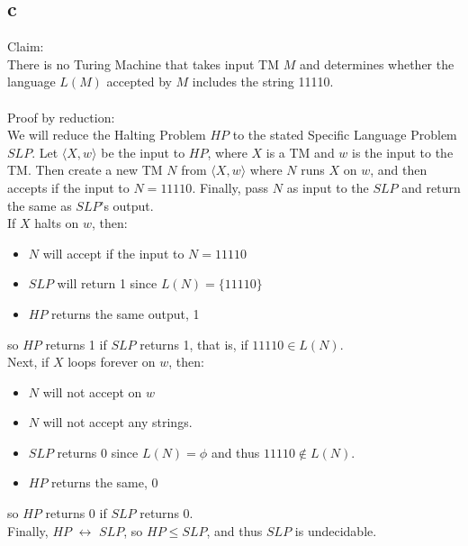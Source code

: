 \documentclass[letterpaper,notitlepage,twoside]{article}
\begin{document}
\subsection*{c}
Claim:\\
There is no Turing Machine that takes input TM $M$ and determines whether the language $L(M)$ accepted by $M$ includes the string 11110.\\\\
Proof by reduction:\\
We will reduce the Halting Problem $HP$ to the stated Specific Language Problem $SLP$. Let $\langle X, w \rangle$ be the input to $HP$, where $X$ is a TM and $w$ is the input to the TM.  Then create a new TM $N$ from $\langle X, w \rangle$ where $N$ runs $X$ on $w$, and then accepts if the input to $N = 11110$. Finally, pass $N$ as input to the $SLP$ and return the same as $SLP$'s output.\\
If $X$ halts on $w$, then:
\begin{itemize}
\item $N$ will accept if the input to $N = 11110$
\item $SLP$ will return 1 since $L(N) = \{11110\}$
\item $HP$ returns the same output, 1
\end{itemize}
so $HP$ returns 1 if $SLP$ returns 1, that is, if $11110 \in L(N)$.\\
Next, if $X$ loops forever on $w$, then:
\begin{itemize}
\item $N$ will not accept on $w$
\item $N$ will not accept any strings.
\item $SLP$ returns 0 since $L(N) = \phi$ and thus $11110 \notin L(N)$.
\item $HP$ returns the same, 0
\end{itemize}
so $HP$ returns 0 if $SLP$ returns 0.\\
Finally, $HP$ $\leftrightarrow$ $SLP$, so $HP \le SLP$, and thus $SLP$ is undecidable.
\end{document}
